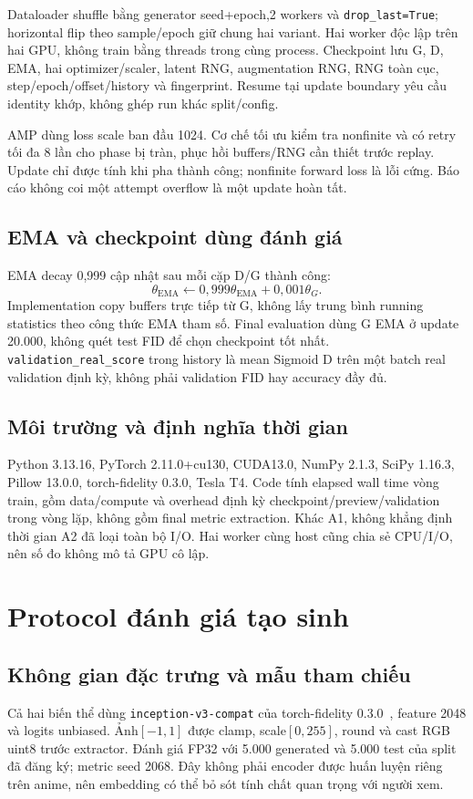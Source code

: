 \documentclass[11pt,a4paper]{article}
\begin{document}
Dataloader shuffle bằng generator seed+epoch,2 workers và \texttt{drop\_last=True}; horizontal flip theo sample/epoch giữ chung hai variant. Hai worker độc lập trên hai GPU, không train bằng threads trong cùng process. Checkpoint lưu G, D, EMA, hai optimizer/scaler, latent RNG, augmentation RNG, RNG toàn cục, step/epoch/offset/history và fingerprint. Resume tại update boundary yêu cầu identity khớp, không ghép run khác split/config.

AMP dùng loss scale ban đầu 1024. Cơ chế tối ưu kiểm tra nonfinite và có retry tối đa 8 lần cho phase bị tràn, phục hồi buffers/RNG cần thiết trước replay. Update chỉ được tính khi pha thành công; nonfinite forward loss là lỗi cứng. Báo cáo không coi một attempt overflow là một update hoàn tất.

\subsection{EMA và checkpoint dùng đánh giá}
EMA decay 0,999 cập nhật sau mỗi cặp D/G thành công:
\begin{equation}
\theta_\mathrm{EMA}\leftarrow 0{,}999\theta_\mathrm{EMA}+0{,}001\theta_G.
\end{equation}
Implementation copy buffers trực tiếp từ G, không lấy trung bình running statistics theo công thức EMA tham số. Final evaluation dùng G EMA ở update 20.000, không quét test FID để chọn checkpoint tốt nhất. \texttt{validation\_real\_score} trong history là mean Sigmoid D trên một batch real validation định kỳ, không phải validation FID hay accuracy đầy đủ.

\subsection{Môi trường và định nghĩa thời gian}
Python 3.13.16, PyTorch 2.11.0+cu130, CUDA13.0, NumPy 2.1.3, SciPy 1.16.3, Pillow 13.0.0, torch-fidelity 0.3.0, Tesla T4. Code tính elapsed wall time vòng train, gồm data/compute và overhead định kỳ checkpoint/preview/validation trong vòng lặp, không gồm final metric extraction. Khác A1, không khẳng định thời gian A2 đã loại toàn bộ I/O. Hai worker cùng host cũng chia sẻ CPU/I/O, nên số đo không mô tả GPU cô lập.
\clearpage

\section{Protocol đánh giá tạo sinh}\label{sec:metrics}
\subsection{Không gian đặc trưng và mẫu tham chiếu}
Cả hai biến thể dùng \texttt{inception-v3-compat} của torch-fidelity 0.3.0~\cite{fidelity}, feature 2048 và logits unbiased. Ảnh$[-1,1]$ được clamp, scale$[0,255]$, round và cast RGB uint8 trước extractor. Đánh giá FP32 với 5.000 generated và 5.000 test của split đã đăng ký; metric seed 2068. Đây không phải encoder được huấn luyện riêng trên anime, nên embedding có thể bỏ sót tính chất quan trọng với người xem.
\end{document}
